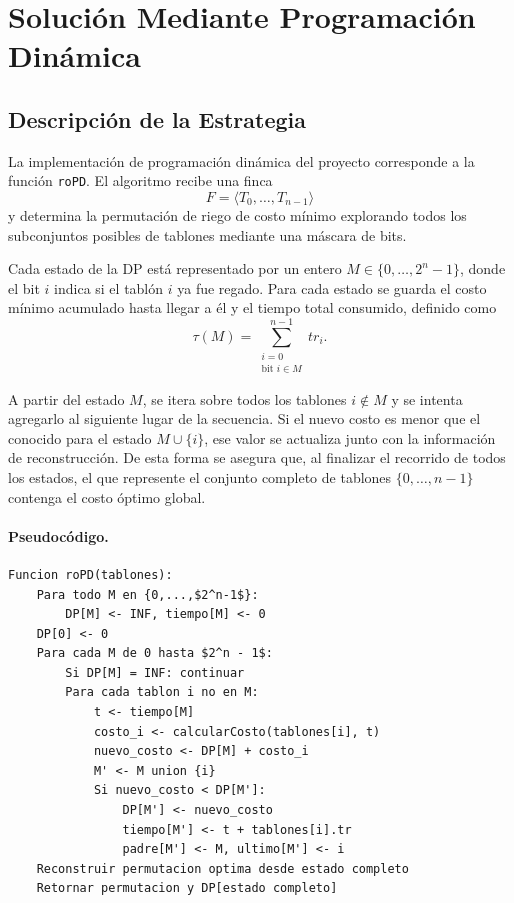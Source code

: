 \documentclass[12pt,a4paper]{article}
\begin{document}
\section{Soluci\'on Mediante Programaci\'on Din\'amica}

\subsection{Descripci\'on de la Estrategia}

La implementaci\'on de programaci\'on din\'amica del proyecto corresponde a la funci\'on \texttt{roPD}. El algoritmo recibe una finca
\[
F=\langle T_0,\dots,T_{n-1}\rangle
\]
y determina la permutaci\'on de riego de costo m\'inimo explorando todos los subconjuntos posibles de tablones mediante una m\'ascara de bits.

Cada estado de la DP est\'a representado por un entero \(M \in \{0,\dots,2^n-1\}\), donde el bit \(i\) indica si el tabl\'on \(i\) ya fue regado. Para cada estado se guarda el costo m\'inimo acumulado hasta llegar a \'el y el tiempo total consumido, definido como
\[
\tau(M) = \sum_{\substack{i=0 \\ \text{bit } i \in M}}^{n-1} tr_i.
\]

A partir del estado \(M\), se itera sobre todos los tablones \(i \notin M\) y se intenta agregarlo al siguiente lugar de la secuencia. Si el nuevo costo es menor que el conocido para el estado \(M \cup \{i\}\), ese valor se actualiza junto con la informaci\'on de reconstrucci\'on. De esta forma se asegura que, al finalizar el recorrido de todos los estados, el que represente el conjunto completo de tablones \(\{0,\dots,n-1\}\) contenga el costo \'optimo global.

\paragraph{Pseudoc\'odigo.}

\begin{center}
\begin{minipage}{0.94\textwidth}
\begin{lstlisting}[mathescape=true,basicstyle=\ttfamily\normalsize\linespread{1.12}\selectfont,aboveskip=0.8em,belowskip=0.8em]
Funcion roPD(tablones):
    Para todo M en {0,...,$2^n-1$}:
        DP[M] <- INF, tiempo[M] <- 0
    DP[0] <- 0
    Para cada M de 0 hasta $2^n - 1$:
        Si DP[M] = INF: continuar
        Para cada tablon i no en M:
            t <- tiempo[M]
            costo_i <- calcularCosto(tablones[i], t)
            nuevo_costo <- DP[M] + costo_i
            M' <- M union {i}
            Si nuevo_costo < DP[M']:
                DP[M'] <- nuevo_costo
                tiempo[M'] <- t + tablones[i].tr
                padre[M'] <- M, ultimo[M'] <- i
    Reconstruir permutacion optima desde estado completo
    Retornar permutacion y DP[estado completo]
\end{lstlisting}
\end{minipage}
\end{center}
\end{document}
